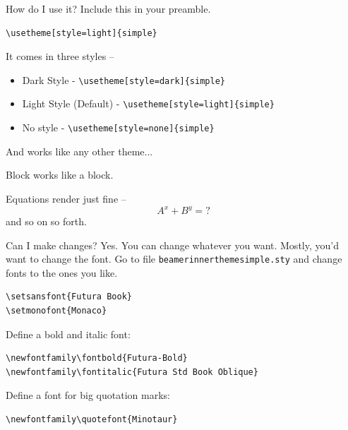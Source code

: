 \documentclass[xetex, aspectratio=169,professionalfont]{beamer}
\begin{document}
\begin{frame}[fragile]{How do I use it?}
	Include this in your preamble.
\begin{verbatim}
\usetheme[style=light]{simple} 
\end{verbatim}

It comes in	three styles --
\begin{itemize}
	\item Dark Style - \verb|\usetheme[style=dark]{simple} |
	\item \alert{Light Style (Default)}  - \verb|\usetheme[style=light]{simple} |
	\item No style - \verb|\usetheme[style=none]{simple} |
\end{itemize}

And works like any other theme...

\begin{block}{Block}
works like a block.
\end{block}

Equations render just fine -- 
\begin{equation}
A^x + B^y = ?
\end{equation}
and so on so forth.
\end{frame}

\begin{frame}[fragile]{Can I make changes?}
Yes. You can change whatever you want. Mostly, you'd want to change the font. Go to file \verb|beamerinnerthemesimple.sty| and change fonts to the ones you like.
\begin{verbatim}
\setsansfont{Futura Book}
\setmonofont{Monaco}
\end{verbatim}
Define a bold and italic font:
\begin{verbatim}
\newfontfamily\fontbold{Futura-Bold}
\newfontfamily\fontitalic{Futura Std Book Oblique}
\end{verbatim}
Define a font for big quotation marks:
\begin{verbatim}
\newfontfamily\quotefont{Minotaur}
\end{verbatim}
\end{frame}

\begin{frame}
	\vspace{2\baselineskip}
\end{frame}
\end{document}
